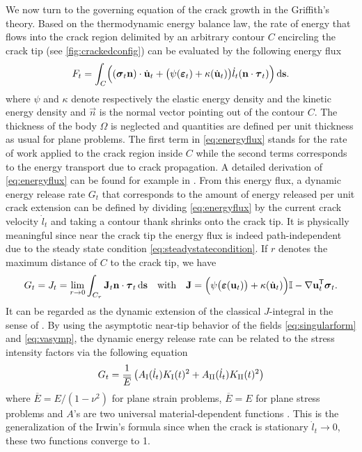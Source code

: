 We now turn to the governing equation of the crack growth in the Griffith's theory. Based on the thermodynamic energy balance law, the rate of energy that flows into the crack region delimited by an arbitrary contour $C$ encircling the crack tip (see \cref{fig:crackedconfig}) can be evaluated by the following energy flux
\begin{equation} \label{eq:energyflux}
F_t=\int_C\Bigl((\sig_t\vec{n})\cdot\dot{\vec{u}}_t+\bigl(\psi(\eps_t)+\kappa(\dot{\vec{u}}_t)\bigr)\dot{l}_t(\vec{n}\cdot\vtau_t)\Bigr)\ds.
\end{equation}
where $\psi$ and $\kappa$ denote respectively the elastic energy density and the kinetic energy density and $\vec{n}$ is the normal vector pointing out of the contour $C$. The thickness of the body $\Omega$ is neglected and quantities are defined per unit thickness as usual for plane problems. The first term in \eqref{eq:energyflux} stands for the rate of work applied to the crack region inside $C$ while the second terms corresponds to the energy transport due to crack propagation. A detailed derivation of \eqref{eq:energyflux} can be found for example in \cite{Freund:1972,NakamuraShihFreund:1985}. From this energy flux, a dynamic energy release rate $G_t$ that corresponds to the amount of energy released per unit crack extension can be defined by dividing \eqref{eq:energyflux} by the current crack velocity $\dot{l}_t$ and taking a contour thank shrinks onto the crack tip. It is physically meaningful since near the crack tip the energy flux is indeed path-independent due to the steady state condition \eqref{eq:steadystatecondition}. If $r$ denotes the maximum distance of $C$ to the crack tip, we have
\begin{equation} \label{eq:Jdyn}
G_t=J_t=\lim_{r\to 0}\int_{C_r}\vec{J}_t\vec{n}\cdot\vtau_t\ds\quad\text{with}\quad\vec{J}=\Bigl(\psi\bigl(\eps(\vec{u}_t)\bigr)+\kappa(\dot{\vec{u}}_t)\Bigr)\mathbb{I}-\nabla\vec{u}_t^\mT\sig_t.
\end{equation}
It can be regarded as the dynamic extension of the classical $J$-integral in the sense of \cite{Cherepanov:1967aa,Rice:1968aa}. By using the asymptotic near-tip behavior of the fields \eqref{eq:singularform} and \eqref{eq:vasymp}, the dynamic energy release rate can be related to the stress intensity factors via the following equation
\begin{equation} \label{eq:GasafunctionofK}
G_t=\frac{1}{\overline{E}}\left(A_\RNN{1}(\dot{l}_t)K_\RNN{1}(t)^2+A_\RNN{2}(\dot{l}_t)K_\RNN{2}(t)^2\right)
\end{equation}
where $\overline{E}=E/(1-\nu^2)$ for plane strain problems, $\overline{E}=E$ for plane stress problems and $A$'s are two universal material-dependent functions \cite[p.~234]{Freund:1990}. This is the generalization of the Irwin's formula \cite{Irwin:1957aa} since when the crack is stationary $\dot{l}_t\to 0$, these two functions converge to 1.

